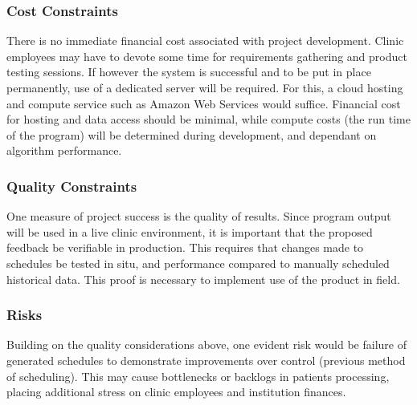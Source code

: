 \documentclass[12pt, titlepage]{article}
\begin{document}
\subsubsection{Cost Constraints}
There is no immediate financial cost associated with project development. Clinic employees may have to devote some time for requirements gathering and product testing sessions. If however the system is successful and to be put in place permanently, use of a dedicated server will be required. For this, a cloud hosting and compute service such as Amazon Web Services would suffice. Financial cost for hosting and data access should be minimal, while compute costs (the run time of the program) will be determined during development, and dependant on algorithm performance.
\newline
\subsubsection{Quality Constraints}
One measure of project success is the quality of results. Since program output will be used in a live clinic environment, it is important that the proposed feedback be verifiable in production. This requires that changes made to schedules be tested in situ, and performance compared to manually scheduled historical data. This proof is necessary to implement use of the product in field.
\newline\
\subsubsection{Risks}
Building on the quality considerations above, one evident risk would be failure of generated schedules to demonstrate improvements over control (previous method of scheduling). This may cause bottlenecks or backlogs in patients processing, placing additional stress on clinic employees and institution finances. 
\newline\
\end{document}
